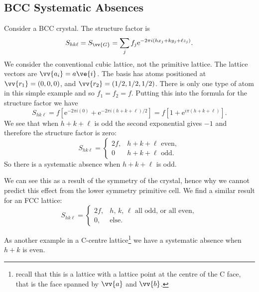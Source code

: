 \documentclass[fleqn]{NotesClass}
\newcommand*{\e}{\mathrm{e}}
\begin{document}
    \subsection{BCC Systematic Absences}
    Consider a BCC crystal.
    The structure factor is
    \begin{equation}
        S_{hk\ell} = S_{\vv{G}} = \sum_j f_j \e^{-2\pi i(hx_j + ky_j + \ell z_j)}.
    \end{equation}
    We consider the conventional cubic lattice, not the primitive lattice.
    The lattice vectors are \(\vv{a_i} = a\ve{i}\).
    The basis has atoms positioned at \(\vv{r_1} = (0, 0, 0)\), and \(\vv{r_2} = (1/2, 1/2, 1/2)\).
    There is only one type of atom in this simple example and so \(f_1 = f_2 = f\).
    Putting this into the formula for the structure factor we have
    \begin{equation}
        S_{hk\ell} = f[\e^{-2\pi i(0)} + \e^{-2\pi i (h + k + \ell)/2}] = f[1 + \e^{i\pi(h + k + \ell)}].
    \end{equation}
    We see that when \(h + k + \ell\) is odd the second exponential gives \(-1\) and therefore the structure factor is zero:
    \begin{equation}
        S_{hk\ell} = 
        \begin{cases}
            2f, & h + k + \ell \text{ even},\\
            0 & h + k + \ell \text{ odd}.
        \end{cases}
    \end{equation}
    So there is a systematic absence when \(h + k + \ell\) is odd.
    
    We can see this as a result of the symmetry of the crystal, hence why we cannot predict this effect from the lower symmetry primitive cell.
    We find a similar result for an FCC lattice:
    \begin{equation}
        S_{hk\ell} = 
        \begin{cases}
            2f, & \text{\(h\), \(k\), \(\ell\) all odd, or all even},\\
            0, & \text{else}.
        \end{cases}
    \end{equation}
    
    As another example in a C-centre lattice\footnote{recall that this is a lattice with a lattice point at the centre of the C face, that is the face spanned by \(\vv{a}\) and \(\vv{b}\).} we have a systematic absence when \(h + k\) is even.
    
\end{document}
